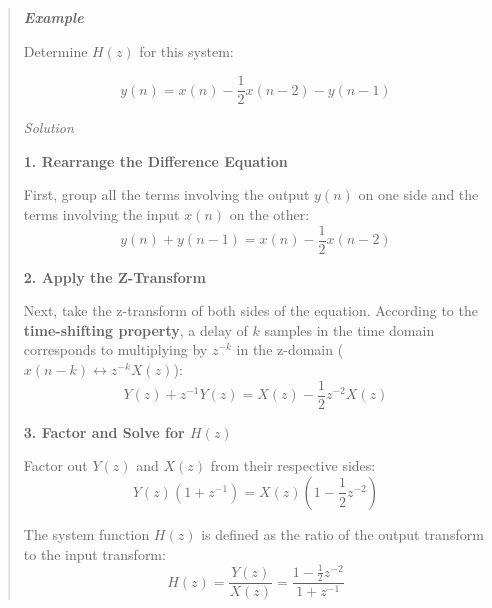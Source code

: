 \begin{quote}
\textbf{\emph{Example}}

Determine \(H(z)\) for this system:

\[y(n) = x(n) - \frac{1}{2}x(n-2) - y(n-1)\]

\emph{Solution}

\textbf{1. Rearrange the Difference Equation}

First, group all the terms involving the output \(y(n)\) on one side and
the terms involving the input \(x(n)\) on the other:
\[y(n) + y(n-1) = x(n) - \frac{1}{2}x(n-2)\]

\textbf{2. Apply the Z-Transform}

Next, take the z-transform of both sides of the equation. According to
the \textbf{time-shifting property}, a delay of \(k\) samples in the
time domain corresponds to multiplying by \(z^{-k}\) in the z-domain
(\(x(n-k) \leftrightarrow z^{-k}X(z)\)):
\[Y(z) + z^{-1}Y(z) = X(z) - \frac{1}{2}z^{-2}X(z)\]

\textbf{3. Factor and Solve for \(H(z)\)}

Factor out \(Y(z)\) and \(X(z)\) from their respective sides:
\[Y(z)(1 + z^{-1}) = X(z)\left(1 - \frac{1}{2}z^{-2}\right)\]

The system function \textbf{\(H(z)\)} is defined as the ratio of the
output transform to the input transform:
\[H(z) = \frac{Y(z)}{X(z)} = \frac{1 - \frac{1}{2}z^{-2}}{1 + z^{-1}}\]
\end{quote}

